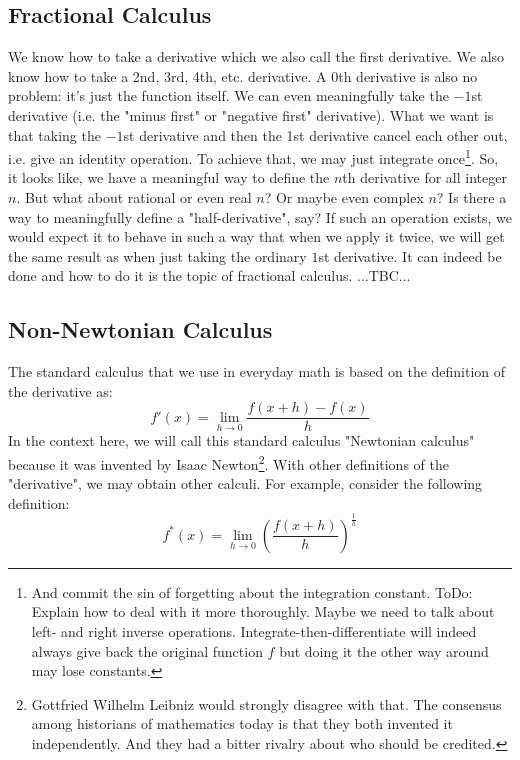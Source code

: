 \subsection{Fractional Calculus}
We know how to take a derivative which we also call the first derivative. We also know how to take a 2nd, 3rd, 4th, etc. derivative. A 0th derivative is also no problem: it's just the function itself. We can even meaningfully take the $-1$st derivative (i.e. the "minus first" or "negative first" derivative). What we want is that taking the $-1$st derivative and then the 1st derivative cancel each other out, i.e. give an identity operation. To achieve that, we may just integrate once\footnote{And commit the sin of forgetting about the integration constant. ToDo: Explain how to deal with it more thoroughly. Maybe we need to talk about left- and right inverse operations. Integrate-then-differentiate will indeed always give back the original function $f$ but doing it the other way around may lose constants.}. So, it looks like, we have a meaningful way to define the $n$th derivative for all integer $n$. But what about rational or even real $n$? Or maybe even complex $n$? Is there a way to meaningfully define a "half-derivative", say? If such an operation exists, we would expect it to behave in such a way that when we apply it twice, we will get the same result as when just taking the ordinary $1$st derivative. It can indeed be done and how to do it is the topic of fractional calculus. ...TBC...





\subsection{Non-Newtonian Calculus}
The standard calculus that we use in everyday math is based on the definition of the derivative as:
\begin{equation}
  f'(x) = \lim_{h \rightarrow 0} \frac{f(x + h) - f(x)}{h}
\end{equation}
In the context here, we will call this standard calculus "Newtonian calculus" because it was invented by Isaac Newton\footnote{Gottfried Wilhelm Leibniz would strongly disagree with that. The consensus among historians of mathematics today is that they both invented it independently. And they had a bitter rivalry about who should be credited.}. With other definitions of the "derivative", we may obtain other calculi. For example, consider the following definition:
\begin{equation}
  f^*(x) = \lim_{h \rightarrow 0} \left(  \frac{f(x + h)}{h}  \right)^{\frac{1}{h}} 
\end{equation}


